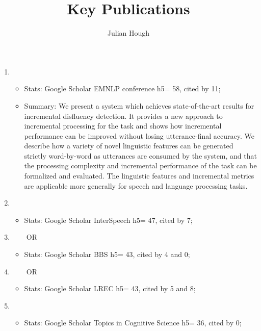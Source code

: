 \documentclass[12pt]{article}
\title{Key Publications}
\author{Julian Hough}
\begin{document}
\maketitle


\begin{enumerate}


\item{}
\begin{itemize}
\item[] Stats: Google Scholar EMNLP conference h5= 58, cited by 11; 
\item[] Summary: We present a system which achieves state-of-the-art results for incremental disfluency detection. It provides a new approach to incremental processing for the task and shows how incremental performance can be improved without losing utterance-final accuracy. We describe how a variety of novel linguistic features can be generated strictly word-by-word as utterances are consumed by the system, and that the processing complexity and incremental performance of the task can be formalized and evaluated. The linguistic features and incremental metrics are applicable more generally for speech and language processing tasks.
\end{itemize}

\item{}
\begin{itemize}
\item[] Stats: Google Scholar InterSpeech h5= 47, cited by 7;
\end{itemize}


\item
{} ~~~~OR~~~~ 
\begin{itemize}
\item[] Stats: Google Scholar BBS h5= 43, cited by 4 and 0;
\end{itemize}

\item
{} ~~~~OR~~~~ 
\begin{itemize}
\item[] Stats: Google Scholar LREC h5= 43, cited by 5 and 8; 
\end{itemize}

\item
{}
\begin{itemize}
\item[] Stats: Google Scholar Topics in Cognitive Science h5= 36, cited by 0;
\end{itemize}


\end{enumerate}
\end{document}
